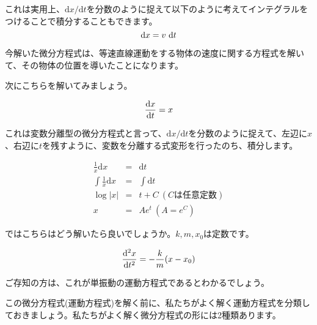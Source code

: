 これは実用上、$\mathrm{d}x/\mathrm{d}t$を分数のように捉えて以下のように考えてインテグラルをつけることで積分することもできます。
\begin{equation}
    \mathrm{d}x =  v \ \mathrm{d}t \notag
\end{equation}

今解いた微分方程式は、等速直線運動をする物体の速度に関する方程式を解いて、その物体の位置を導いたことになります。

次にこちらを解いてみましょう。

\begin{equation}
    \frac{\mathrm{d}x}{\mathrm{d}t} = x \notag
\end{equation}

これは変数分離型の微分方程式と言って、$\mathrm{d}x/\mathrm{d}t$を分数のように捉えて、左辺に$x$、右辺に$t$を残すように、変数を分離する式変形を行ったのち、積分します。

\begin{eqnarray}
    \frac{1}{x}\mathrm{d}x &=& \mathrm{d}t \nonumber \\
    \int \frac{1}{x}\mathrm{d}x &=&\int \mathrm{d}t \nonumber \\
    \log |x| &=& t + C \  (Cは任意定数)\nonumber \\
    x &=& Ae^t \  (A = e^C) \nonumber
\end{eqnarray}

ではこちらはどう解いたら良いでしょうか。$k,m,x_0$は定数です。

\begin{equation}
    \frac{\mathrm{d^2}x}{\mathrm{d}t^2} = -\frac{k}{m}(x - x_0) \notag
\end{equation}

ご存知の方は、これが単振動の運動方程式であるとわかるでしょう。

この微分方程式(運動方程式)を解く前に、私たちがよく解く運動方程式を分類しておきましょう。私たちがよく解く微分方程式の形には2種類あります。


